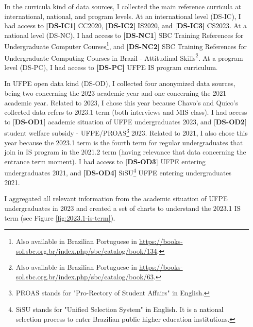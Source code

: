 In the curricula kind of data sources, I collected the main reference curricula at international, national, and program levels. At an international level (\acrfull{DS-IC}), I had access to \textbf{[DS-IC1]} \acrfull{CC2020}, \textbf{[DS-IC2]} \gls{IS2020}, and \textbf{[DS-IC3]} \gls{CS2023}. At a national level (\acrfull{DS-NC}), I had access to \textbf{[DS-NC1]} \gls{SBC} Training References for Undergraduate Computer Courses\footnote{Also available in Brazilian Portuguese in \url{https://books-sol.sbc.org.br/index.php/sbc/catalog/book/134}.}, and \textbf{[DS-NC2]} \gls{SBC} Training References for Undergraduate Computing Courses in Brazil - Attitudinal Skills\footnote{Also available in Brazilian Portuguese in \url{https://books-sol.sbc.org.br/index.php/sbc/catalog/book/63}.}. At a program level (\acrfull{DS-PC}), I had access to \textbf{[DS-PC]} \gls{UFPE} \acrfull{IS} program curriculum.

In \gls{UFPE} open data kind (\acrfull{DS-OD}), I collected four anonymized data sources, being two concerning the 2023 academic year and one concerning the 2021 academic year. Related to 2023, I chose this year because Chavo's and Quico's collected data refers to 2023.1 term (both interviews and \gls{MIS} class). I had access to \textbf{[DS-OD1]} academic situation of \gls{UFPE} undergraduates 2023, and \textbf{[DS-OD2]} student welfare subsidy - \gls{UFPE}/\gls{PROAS}\footnote{PROAS stands for "Pro-Rectory of Student Affairs" in English.} 2023. Related to 2021, I also chose this year because the 2023.1 term is the fourth term for regular undergraduates that join in \gls{IS} program in the 2021.2 term (having relevance that data concerning the entrance term moment). I had access to \textbf{[DS-OD3]} \gls{UFPE} entering undergraduates 2021, and \textbf{[DS-OD4]} \gls{SiSU}\footnote{SiSU stands for "Unified Selection System" in English. It is a national selection process to enter Brazilian public higher education institutions.} \gls{UFPE} entering undergraduates 2021.

I aggregated all relevant information from the academic situation of \gls{UFPE} undergraduates in 2023 and created a set of charts to understand the 2023.1 \gls{IS} term (see Figure \ref{fig:2023.1-is-term}).

